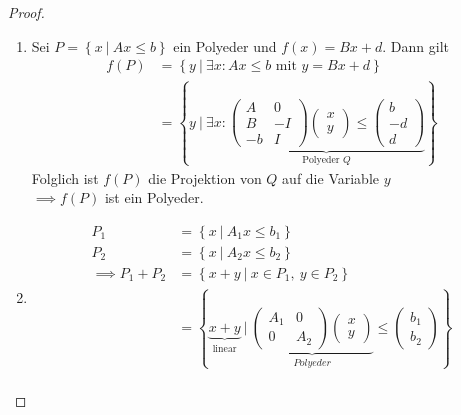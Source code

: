 \begin{proof}
	\begin{enumerate}[label = (\alph*)]
		\item Sei $P = \left\{ x \ |\ Ax \leq b \right\}$ ein Polyeder und $f(x)= Bx+d$.
			Dann gilt 
			\begin{align*}
				f(P) &= \left\{ y \ |\ \exists x: Ax \leq b \text{ mit } y = Bx +d \right\}\\
					 &= \left\{ y \ |\ \exists x: \underbrace{
					 \begin{pmatrix}
						 A & 0\\
						 B &-I\\
						 -b& I
					 \end{pmatrix}
					 \begin{pmatrix}
					 	x\\y
					 \end{pmatrix}
					 \leq
					 \begin{pmatrix}
					 	b\\
						-d\\
						d
					 \end{pmatrix}
				 	}_{\text{Polyeder }Q }
					 \right\}
			\end{align*}
			Folglich ist $f(P)$ die Projektion von $Q$ auf die Variable $y$ \\
			$\implies f(P)$ ist ein Polyeder.
		\item 
			\begin{align*}
				P_{1} &= \left\{ x\ |\ A_{1}x \leq b_{1} \right\}\\
				P_{2} &=  \left\{ x\ |\ A_{2}x \leq b_{2} \right\}\\
			\implies P_{1}+P_{2} &=  \left\{ x+y\ |\ x \in P_{1},\ y \in P_{2} \right\}\\
								 &=\left\{ \underbrace{x+y}_{\text{linear}}\ |\ 
									\underbrace{
								 	\begin{pmatrix}
										 A_{1} & 0 \\
										 0 & A_{2}
								 	\end{pmatrix}
									\begin{pmatrix}
										x\\y
									\end{pmatrix}
									}_{Polyeder}
									\leq
									\begin{pmatrix}
										b_{1}\\
										b_{2}
									\end{pmatrix}
								 	\right\}\\
			\end{align*}
	\end{enumerate}
\end{proof}
